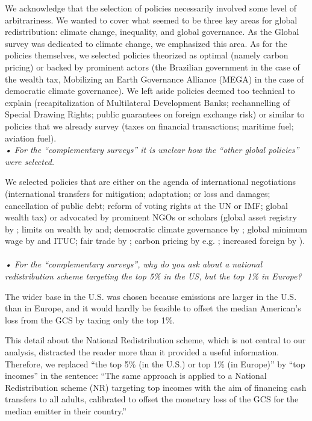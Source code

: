 \documentclass[12pt,english]{article}
\begin{document}
We acknowledge that the selection of policies necessarily involved some level of arbitrariness. We wanted to cover what seemed to be three key areas for global redistribution: climate change, inequality, and global governance. As the Global survey was dedicated to climate change, we emphasized this area. As for the policies themselves, we selected policies theorized as optimal (namely carbon pricing) or backed by prominent actors (the Brazilian government in the case of the wealth tax, Mobilizing an Earth Governance Alliance (MEGA) in the case of democratic climate governance). 
We left aside policies deemed too technical to explain (recapitalization of Multilateral Development Banks; rechannelling of Special Drawing Rights; public guarantees on foreign exchange risk) or similar to policies that we already survey (taxes on financial transactions; maritime fuel; aviation fuel). 
~\\

\textit{• For the “complementary surveys” it is unclear how the “other global policies” were selected.}

We selected policies that are either on the agenda of international negotiations (international transfers for mitigation; adaptation; or loss and damages; cancellation of public debt; reform of voting rights at the UN or IMF; global wealth tax) or advocated by prominent NGOs or scholars (global asset registry by \citet{icrict_roadmap_2020}; limits on wealth by \citet{robeyns_limitarianism_2024} and\citet{piketty_brief_2022}; democratic climate governance by \citet{dryzek_global_2011}; global minimum wage by \citet{palley_financial_2013} and ITUC; %
fair trade by \citet{hickel_divide_2017}; carbon pricing by e.g. \citet{cramton_global_2017}; increased foreign by \citet{concord_aid_2019}). 
~\\

\textit{• For the “complementary surveys”, why do you ask about a national redistribution scheme targeting the top 5\% in the US, but the top 1\% in Europe?}

The wider base in the U.S. was chosen because emissions are larger in the U.S. than in Europe, and it would hardly be feasible to offset the median American's loss from the GCS by taxing only the top 1\%. 

This detail about the National Redistribution scheme, which is not central to our analysis, distracted the reader more than it provided a useful information. Therefore, we replaced ``the top 5\% (in the U.S.) or top 1\% (in Europe)'' by ``top incomes'' in the sentence: ``The same approach is applied to a National Redistribution scheme (NR) targeting top incomes with the aim of financing cash transfers to all adults, calibrated to offset the monetary loss of the GCS for the median emitter in their country.''
~\\
\end{document}
